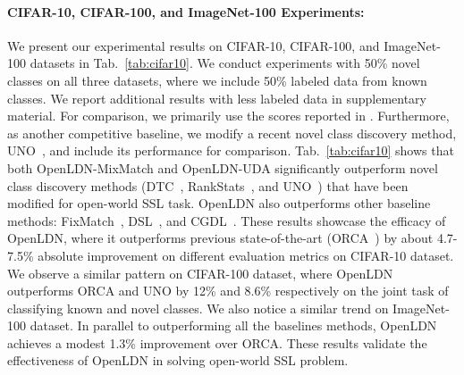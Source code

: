 \documentclass[runningheads]{eccv2022submission}
\begin{document}
\paragraph{\textbf{CIFAR-10, CIFAR-100, and ImageNet-100 Experiments:}}
We present our experimental results on CIFAR-10, CIFAR-100, and ImageNet-100 datasets in Tab.~\ref{tab:cifar10}. We conduct experiments with 50\% novel classes on all three datasets, where we include 50\% labeled data from known classes. We report additional results with less labeled data in supplementary material. For comparison, we primarily use the scores reported in \cite{cao2022openworld}. Furthermore, as another competitive baseline, we modify a recent novel class discovery method, UNO~\cite{fini2021unified}, and include its performance for comparison. Tab.~\ref{tab:cifar10} shows that both OpenLDN-MixMatch and OpenLDN-UDA significantly outperform novel class discovery methods (DTC~\cite{han2019learning}, RankStats~\cite{Han2020Automatically}, and UNO~\cite{fini2021unified}) that have been modified for open-world SSL task. OpenLDN also outperforms other baseline methods: FixMatch~\cite{FixMatch}, DSL~\cite{guo2020safe}, and CGDL~\cite{sun2020conditional}. These results showcase the efficacy of OpenLDN, where it outperforms previous state-of-the-art (ORCA~\cite{cao2022openworld}) by about 4.7-7.5\% absolute improvement on different evaluation metrics on CIFAR-10 dataset. We observe a similar pattern on CIFAR-100 dataset, where OpenLDN outperforms ORCA and UNO by 12\% and 8.6\% respectively on the joint task of classifying known and novel classes. We also notice a similar trend on ImageNet-100 dataset. In parallel to outperforming all the baselines methods, OpenLDN achieves a modest 1.3\% improvement over ORCA. These results validate the effectiveness of OpenLDN in solving open-world SSL problem. 
\end{document}
